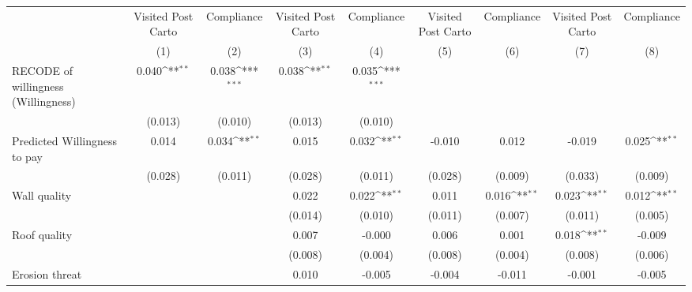 {
\def\sym#1{\ifmmode^{#1}\else\(^{#1}\)\fi}
\begin{tabular}{l*{8}{c}}
\toprule
                &\multicolumn{1}{c}{Visited Post Carto}&\multicolumn{1}{c}{Compliance}&\multicolumn{1}{c}{Visited Post Carto}&\multicolumn{1}{c}{Compliance}&\multicolumn{1}{c}{Visited Post Carto}&\multicolumn{1}{c}{Compliance}&\multicolumn{1}{c}{Visited Post Carto}&\multicolumn{1}{c}{Compliance}\\
                &\multicolumn{1}{c}{(1)}         &\multicolumn{1}{c}{(2)}         &\multicolumn{1}{c}{(3)}         &\multicolumn{1}{c}{(4)}         &\multicolumn{1}{c}{(5)}         &\multicolumn{1}{c}{(6)}         &\multicolumn{1}{c}{(7)}         &\multicolumn{1}{c}{(8)}         \\
\midrule
RECODE of willingness (Willingness)&    0.040\sym{**} &    0.038\sym{***}&    0.038\sym{**} &    0.035\sym{***}&                  &                  &                  &                  \\
                &  (0.013)         &  (0.010)         &  (0.013)         &  (0.010)         &                  &                  &                  &                  \\
Predicted Willingness to pay&    0.014         &    0.034\sym{**} &    0.015         &    0.032\sym{**} &   -0.010         &    0.012         &   -0.019         &    0.025\sym{**} \\
                &  (0.028)         &  (0.011)         &  (0.028)         &  (0.011)         &  (0.028)         &  (0.009)         &  (0.033)         &  (0.009)         \\
Wall quality    &                  &                  &    0.022         &    0.022\sym{**} &    0.011         &    0.016\sym{**} &    0.023\sym{**} &    0.012\sym{**} \\
                &                  &                  &  (0.014)         &  (0.010)         &  (0.011)         &  (0.007)         &  (0.011)         &  (0.005)         \\
Roof quality    &                  &                  &    0.007         &   -0.000         &    0.006         &    0.001         &    0.018\sym{**} &   -0.009         \\
                &                  &                  &  (0.008)         &  (0.004)         &  (0.008)         &  (0.004)         &  (0.008)         &  (0.006)         \\
Erosion threat  &                  &                  &    0.010         &   -0.005         &   -0.004         &   -0.011         &   -0.001         &   -0.005         \\

\end{tabular}}

